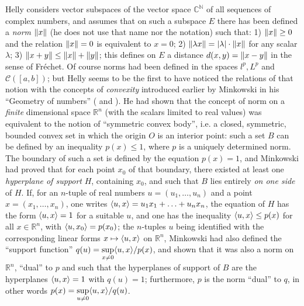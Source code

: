 \documentclass[12pt,a4paper,leqno,twoside]{extbook}
\DeclarePairedDelimiter{\norm}{\lVert}{\rVert}
\DeclarePairedDelimiter{\ip}{\langle}{\rangle}
\newcommand{\Cont}{\mathcal{C}}
\newcommand{\C}{\mathbb{C}}
\newcommand{\R}{\mathbb{R}}
\newcommand{\N}{\mathbb{N}}
\begin{document}
Helly considers vector subspaces of the vector space \(\C^{\N}\) of all sequences of complex numbers, and assumes that on such a subspace \(E\) there has been defined a \emph{norm} \(\norm{x}\) (he does not use that name nor the notation) such that: 1) \(\norm{x} \geq 0\) and the relation \(\norm{x} = 0\) is equivalent to \(x = 0\); 2) \(\norm{\lambda x} = |\lambda| \cdot \norm{x}\) for any scalar \(\lambda\); 3) \(\norm{x+y} \leq \norm{x} + \norm{y}\); this defines on \(E\) a distance \(d(x,y) = \norm{x-y}\) in the sense of Fréchet. Of course norms had been defined in the spaces \(l^p, L^p\) and \(\Cont([a,b])\); but Helly seems to be the first to have noticed the relations of that notion with the concepts of \emph{convexity} introduced earlier by Minkowski in his ``Geometry of numbers'' (\cite{161} and \cite{162}). He had shown that the concept of norm on a \emph{finite} dimensional space \(\R^n\) (with the scalars limited to real values) was equivalent to the notion of ``symmetric convex body'', i.e. a closed, symmetric, bounded convex set in which the origin \(O\) is an interior point: such a set \(B\) can be defined by an inequality \(p(x) \leq 1\), where \(p\) is a uniquely determined norm. The boundary of such a set is defined by the equation \(p(x) = 1\), and Minkowski had proved that for each point \(x_0\) of that boundary, there existed at least one \emph{hyperplane of support} \(H\), containing \(x_0\), and such that \(B\) lies entirely \emph{on one side} of \(H\). If, for an \(n\)-tuple of real numbers \(u = (u_1, \ldots, u_n)\) and a point \(x = (x_1, \ldots, x_n)\), one writes \(\ip{u,x} = u_1 x_1 + \ldots + u_n x_n\), the equation of \(H\) has the form \(\ip{u,x} = 1\) for a suitable \(u\), and one has the inequality \(\ip{u,x} \leq p(x)\) for all \(x \in \R^n\), with \(\ip{u, x_0} = p(x_0)\); the \(n\)-tuples \(u\) being identified with the corresponding linear forms \(x \mapsto \ip{u, x}\) on \(\R^n\), Minkowski had also defined the ``support function'' \(q(u) = \sup\limits_{x \neq 0}\ip{u,x}/p(x)\), and shown that it was also a norm on \(\R^n\), ``dual'' to \(p\) and such that the hyperplanes of support of \(B\) are the hyperplanes \(\ip{u,x} = 1\) with \(q(u) = 1\); furthermore, \(p\) is the norm ``dual'' to \(q\), in other words \(p(x) = \sup\limits_{u \neq 0}\ip{u,x}/q(u)\).
\end{document}
